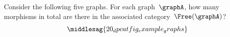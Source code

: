 \vfill
\begin{widepar}
    \begin{gradedexercise}
        \label{ex:HowManyMorphisms}
        Consider the following five graphs.
        For each graph~$\graphA$, how many morphisms in total are there in the associated category~$\Free(\graphA)$?
        \begin{equation}
            \middlesag{20_dpcatfig_example_graphs}
        \end{equation}
    \end{gradedexercise}
\end{widepar}

